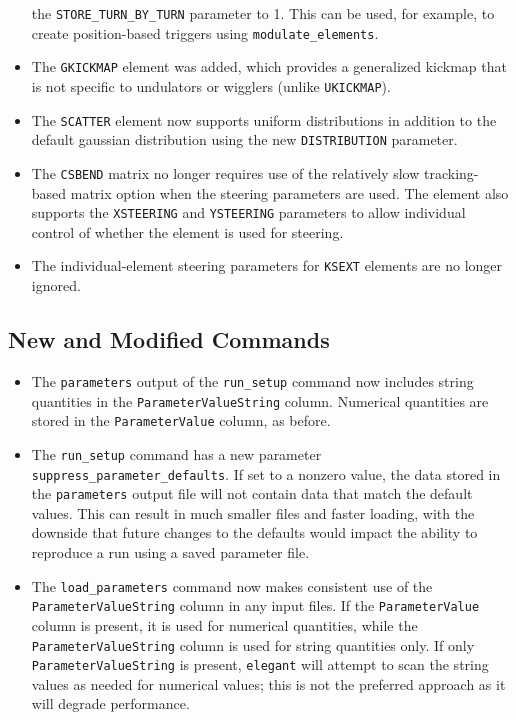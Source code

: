 \documentclass[11pt]{article}
\begin{document}
\begin{itemize}
  the \verb|STORE_TURN_BY_TURN| parameter to 1. This can be used, for example, to create position-based triggers using
  \verb|modulate_elements|. 
\item The \verb|GKICKMAP| element was added, which provides a generalized kickmap that is not specific to
  undulators or wigglers (unlike \verb|UKICKMAP|).
\item The \verb|SCATTER| element now supports uniform distributions in addition to the default gaussian distribution
  using the new \verb|DISTRIBUTION| parameter.
\item The \verb|CSBEND| matrix no longer requires use of the relatively slow tracking-based matrix option when
  the steering parameters are used. The element also supports the \verb|XSTEERING| and \verb|YSTEERING| parameters
  to allow individual control of whether the element is used for steering.
\item The individual-element steering parameters for \verb|KSEXT| elements are no longer ignored.
\end{itemize}


\subsection{New and Modified Commands}
\begin{itemize}
\item The \verb|parameters| output of the \verb|run_setup| command now includes string quantities in the
  \verb|ParameterValueString| column. Numerical quantities are stored in the \verb|ParameterValue| column, as before.
\item The \verb|run_setup| command has a new parameter \verb|suppress_parameter_defaults|. If set to a nonzero value,
  the data stored in the \verb|parameters| output file will not contain data that match the default values.
  This can result in much smaller files and faster loading, with the downside that future changes to the
  defaults would impact the ability to reproduce a run using a saved parameter file.
\item The \verb|load_parameters| command now makes consistent use of the \verb|ParameterValueString| column
  in any input files. If the \verb|ParameterValue| column is present, it is used for numerical quantities, 
  while the \verb|ParameterValueString| column is used for string quantities only.
  If only \verb|ParameterValueString| is present, \verb|elegant| will attempt to scan the string values as
  needed for numerical values; this is not the preferred approach as it will degrade performance.
\end{itemize}
\end{document}
